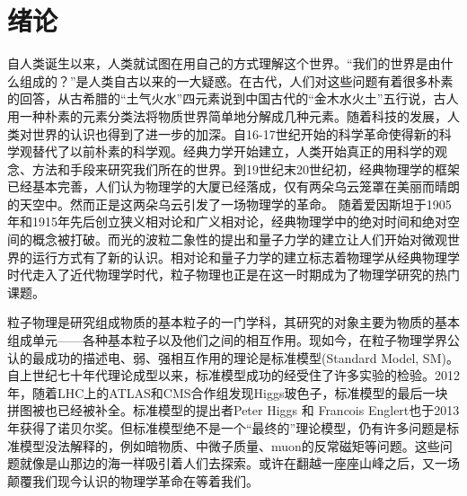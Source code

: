 

\setcounter{section}{0}



\chapter{绪论}

\setcounter{section}{0}

\setcounter{figure}{0}
\setcounter{table}{0}
\setcounter{equation}{0}

自人类诞生以来，人类就试图在用自己的方式理解这个世界。“我们的世界是由什么组成的？”是人类自古以来的一大疑惑。在古代，人们对这些问题有着很多朴素的回答，从古希腊的“土气火水”四元素说到中国古代的“金木水火土”五行说，古人用一种朴素的元素分类法将物质世界简单地分解成几种元素。随着科技的发展，人类对世界的认识也得到了进一步的加深。自16-17世纪开始的科学革命使得新的科学观替代了以前朴素的科学观。经典力学开始建立，人类开始真正的用科学的观念、方法和手段来研究我们所在的世界。到19世纪末20世纪初，经典物理学的框架已经基本完善，人们认为物理学的大厦已经落成，仅有两朵乌云笼罩在美丽而晴朗的天空中。然而正是这两朵乌云引发了一场物理学的革命。
随着爱因斯坦于1905年和1915年先后创立狭义相对论和广义相对论，经典物理学中的绝对时间和绝对空间的概念被打破。而光的波粒二象性的提出和量子力学的建立让人们开始对微观世界的运行方式有了新的认识。相对论和量子力学的建立标志着物理学从经典物理学时代走入了近代物理学时代，粒子物理也正是在这一时期成为了物理学研究的热门课题。

粒子物理是研究组成物质的基本粒子的一门学科，其研究的对象主要为物质的基本组成单元——各种基本粒子以及他们之间的相互作用。现如今，在粒子物理学界公认的最成功的描述电、弱、强相互作用的理论是标准模型(Standard Model, SM)。自上世纪七十年代理论成型以来，标准模型成功的经受住了许多实验的检验。2012年，随着LHC上的ATLAS和CMS合作组发现Higgs玻色子\cite{ATLAS:2012yve,CMS:2012qbp}，标准模型的最后一块拼图被也已经被补全。标准模型的提出者Peter Higgs 和 Francois Englert也于2013年获得了诺贝尔奖。但标准模型绝不是一个“最终的”理论模型，仍有许多问题是标准模型没法解释的，例如暗物质、中微子质量、muon的反常磁矩等问题。这些问题就像是山那边的海一样吸引着人们去探索。或许在翻越一座座山峰之后，又一场颠覆我们现今认识的物理学革命在等着我们。



% 










